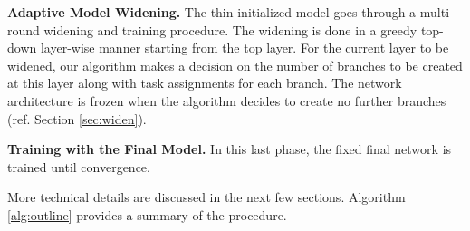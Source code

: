 \documentclass[10pt,twocolumn,letterpaper]{article}
\begin{document}
{\bf Adaptive Model Widening.}
The thin initialized model goes through a multi-round widening and training procedure. The widening is done in a greedy top-down layer-wise manner starting from the top layer. For the current layer to be widened, our algorithm makes a decision on the number of branches to be created at this layer along with task assignments for each branch. The network architecture is frozen when the algorithm decides to create no further branches (ref. Section \ref{sec:widen}).   

{\bf Training with the Final Model.} In this last phase, the fixed final network is trained %
until convergence. %

More technical details are discussed in the next few sections. Algorithm \ref{alg:outline} provides a summary of the procedure. 
\end{document}
